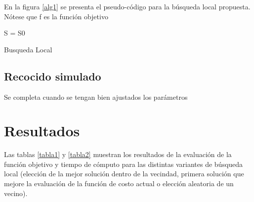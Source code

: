 \documentclass{ci5652}
\begin{document}
En la figura \ref{alg1} se presenta el pseudo-código para la búsqueda local propuesta. Nótese que f es la función objetivo

\begin{algorithm}
 \label{alg1}
 \DontPrintSemicolon
 \vspace*{0.1cm}
 S = S0 
 \vspace*{0.1cm}
 \caption{Busqueda Local}
\end{algorithm}

\subsection{Recocido simulado}
 Se completa cuando se tengan bien ajustados los parámetros

\section{Resultados}

Las tablas \ref{tabla1} y \ref{tabla2} muestran los resultados de la evaluación de la función objetivo y tiempo de cómputo para las distintas variantes de búsqueda local (elección de la mejor solución dentro de la vecindad, primera solución que mejore la evaluación de la función de costo actual o elección aleatoria de un vecino).

\begin{table}
\end{table}

\begin{table}
\end{table}
\end{document}
